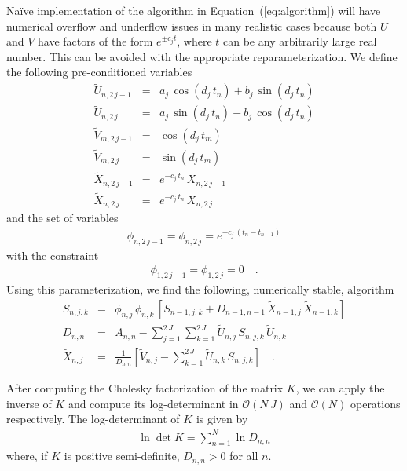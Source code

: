 \documentclass[manuscript, letterpaper]{aastex6}
\makeatletter
\let\origsubsection\subsection
\renewcommand\subsection{\@ifstar{\starsubsection}{\nostarsubsection}}
\newcommand\nostarsubsection[1]{\subsectionprelude\origsubsection{#1}}
\newcommand\starsubsection[1]{\subsectionprelude\origsubsection*{#1}}
\newcommand\subsectionprelude{\vspace{1em}}
\renewcommand{\eqref}[1]{\ref{eq:#1}}
\newcommand{\Eq}[1]{Equation~(\eqref{#1})}
\newcommand{\eq}[1]{\Eq{#1}}
\makeatother
\begin{document}
\subsection{Pre-conditioning}

Na\"ive implementation of the algorithm in \eq{algorithm} will have numerical
overflow and underflow issues in many realistic cases because both $U$ and $V$
have factors of the form $e^{\pm c_j t}$, where $t$ can be any arbitrarily large
real number.
This can be avoided with the appropriate reparameterization.
We define the following pre-conditioned variables
\begin{eqnarray}
\tilde{U}_{n,2\,j-1} &=& a_j\,\cos(d_j\,t_n) + b_j\,\sin(d_j\,t_n) \\
\tilde{U}_{n,2\,j} &=& a_j\,\sin(d_j\,t_n) - b_j\,\cos(d_j\,t_n) \\
\tilde{V}_{m,2\,j-1} &=& \cos(d_j\,t_m) \\
\tilde{V}_{m,2\,j} &=& \sin(d_j\,t_m) \\
\tilde{X}_{n,2\,j-1} &=& e^{-c_j\,t_n}\,X_{n,2\,j-1} \\
\tilde{X}_{n,2\,j} &=& e^{-c_j\,t_n}\,X_{n,2\,j}
\end{eqnarray}
and the set of variables
\begin{eqnarray}
\phi_{n,2\,j-1} = \phi_{n,2\,j} = e^{-c_j\,(t_n - t_{n-1})}
\end{eqnarray}
with the constraint
\begin{eqnarray}
\phi_{1,2\,j-1} = \phi_{1,2\,j} = 0 \quad.
\end{eqnarray}
Using this parameterization, we find the following, numerically stable,
algorithm
\begin{eqnarray}
    S_{n,j,k} &=& \phi_{n,j}\,\phi_{n,k}\,\left[S_{n-1,j,k} +
    D_{n-1,n-1}\,\tilde{X}_{n-1,j}\,\tilde{X}_{n-1,k}\right] \nonumber\\
D_{n,n} &=& A_{n,n} -
    \sum_{j=1}^{2\,J}\sum_{k=1}^{2\,J} \tilde{U}_{n,j}\,S_{n,j,k}\,\tilde{U}_{n,k}
    \nonumber\\
\tilde{X}_{n,j} &=& \frac{1}{D_{n,n}}\left[ \tilde{V}_{n,j} -
    \sum_{k=1}^{2\,J}\tilde{U}_{n,k}\,S_{n,j,k} \right] \quad.
\end{eqnarray}

\subsection{Solving}

After computing the Cholesky factorization of the matrix $K$, we can apply
the inverse of $K$ and compute its log-determinant in $\mathcal{O}(N\,J)$ and
$\mathcal{O}(N)$ operations respectively.
The log-determinant of $K$ is given by
\begin{eqnarray}
    \ln \det K = \sum_{n=1}^N \ln D_{n,n}
\end{eqnarray}
where, if $K$ is positive semi-definite, $D_{n,n}>0$ for all $n$.
\end{document}
